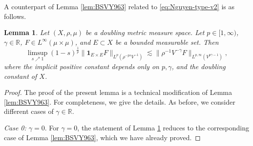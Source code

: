 \documentclass[11pt]{amsart}
\newtheorem{lemma}[theorem]{Lemma}
\theoremstyle{definition}
\theoremstyle{remark}
\numberwithin{equation}{section}
\newcommand{\Norm}[2]{\|#1\|_{#2}}
\begin{document}
A counterpart of Lemma \ref{lem:BSVY963} related to \eqref{eq:Nguyen-type-v2}
is as follows.

\begin{lemma}\label{lem:BSVY105}
Let $(X,\rho,\mu)$ be a doubling metric measure space.
Let $p\in[1,\infty)$, $\gamma\in\mathbb{R}$,
$F\in L^\infty(\mu\times\mu)$, and $E\subset X$ be a bounded measurable set. Then
\begin{equation*}
  \limsup_{s\nearrow 1}(1-s)^{\frac1p}\Norm{\mathbf{1}_{E\times
  E}F}{L^{p}(\rho^{-ps}V^{-1})}
  \lesssim\Norm{\rho^{-1}V^{-\gamma}F}{L^{p,\infty}(V^{p\gamma-1})},
\end{equation*}
where the implicit positive constant depends only on $p,\gamma$, and the doubling constant
of $X$.
\end{lemma}

\begin{proof}
The proof of the present lemma is a technical modification of Lemma \ref{lem:BSVY963}. For
completeness, we give the details. As before, we consider different cases of
$\gamma\in\mathbb{R}$.

\emph{Case 0: $\gamma=0$}. For $\gamma=0$, the statement of Lemma \ref{lem:BSVY105} reduces
to the corresponding case of Lemma \ref{lem:BSVY963}, which we have already proved.


\end{proof}
\end{document}
